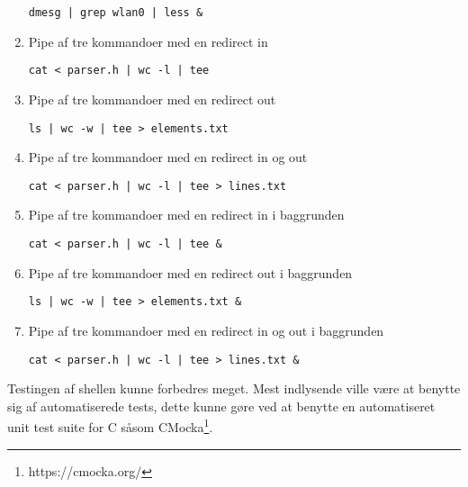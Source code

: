 \begin{enumerate}
	\verb+dmesg | grep wlan0 | less &+
	\item  Pipe af tre kommandoer med en redirect in
	
	\verb+cat < parser.h | wc -l | tee+
	\item  Pipe af tre kommandoer med en redirect out
	
	\verb+ls | wc -w | tee > elements.txt+
	\item  Pipe af tre kommandoer med en redirect in og out
	
	\verb+cat < parser.h | wc -l | tee > lines.txt+
	\item  Pipe af tre kommandoer med en redirect in i baggrunden
	
	\verb+cat < parser.h | wc -l | tee &+
	\item  Pipe af tre kommandoer med en redirect out i baggrunden
	
	\verb+ls | wc -w | tee > elements.txt &+
	\item  Pipe af tre kommandoer med en redirect in og out i baggrunden
	
	\verb+cat < parser.h | wc -l | tee > lines.txt &+
\end{enumerate}

Testingen af shellen kunne forbedres meget. Mest indlysende ville være at benytte sig af automatiserede tests, dette kunne gøre ved at benytte en automatiseret unit test suite for C såsom CMocka\footnote{https://cmocka.org/}.
